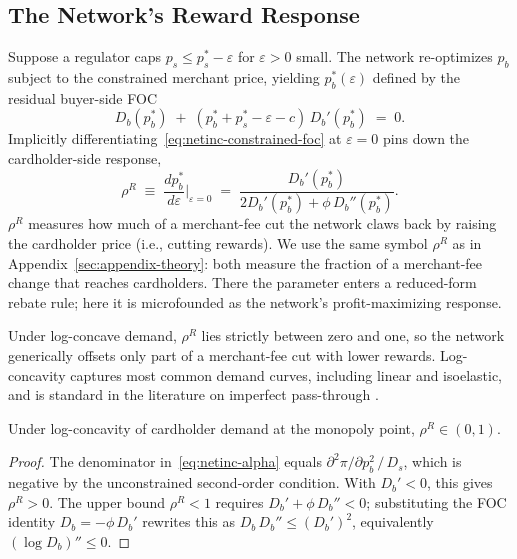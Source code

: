 \documentclass[main.tex]{subfiles}
\begin{document}
\subsection{The Network's Reward Response}\label{subsec:netinc-envelope}

Suppose a regulator caps $p_s\leq p_s^*-\varepsilon$ for $\varepsilon>0$ small.
The network re-optimizes $p_b$ subject to the constrained merchant price, yielding $p_b^*(\varepsilon)$ defined by the residual buyer-side FOC
\begin{equation}
D_b(p_b^*)\;+\;(p_b^*+p_s^*-\varepsilon-c)\,D_b'(p_b^*)\;=\;0.
\label{eq:netinc-constrained-foc}
\end{equation}
Implicitly differentiating~\eqref{eq:netinc-constrained-foc} at $\varepsilon=0$ pins down the cardholder-side response,
\begin{equation}
\rho^R\;\equiv\;\frac{dp_b^*}{d\varepsilon}\bigg|_{\varepsilon=0}\;=\;\frac{D_b'(p_b^*)}{2D_b'(p_b^*)+\phi\,D_b''(p_b^*)}.
\label{eq:netinc-alpha}
\end{equation}
$\rho^R$ measures how much of a merchant-fee cut the network claws back by raising the cardholder price (i.e., cutting rewards).
We use the same symbol $\rho^R$ as in Appendix~\ref{sec:appendix-theory}: both measure the fraction of a merchant-fee change that reaches cardholders.
There the parameter enters a reduced-form rebate rule; here it is microfounded as the network's profit-maximizing response.

Under log-concave demand, $\rho^R$ lies strictly between zero and one, so the network generically offsets only part of a merchant-fee cut with lower rewards.
Log-concavity captures most common demand curves, including linear and isoelastic, and is standard in the literature on imperfect pass-through \citep{Weyl.Fabinger2013}.

\begin{lemma}\label{lem:alpha-range}
Under log-concavity of cardholder demand at the monopoly point, $\rho^R\in(0,1)$.
\end{lemma}

\begin{proof}
The denominator in~\eqref{eq:netinc-alpha} equals $\partial^2\pi/\partial p_b^2\,/\,D_s$, which is negative by the unconstrained second-order condition. With $D_b'<0$, this gives $\rho^R>0$. The upper bound $\rho^R<1$ requires $D_b'+\phi\,D_b''<0$; substituting the FOC identity $D_b=-\phi\,D_b'$ rewrites this as $D_b\,D_b''\leq(D_b')^2$, equivalently $(\log D_b)''\leq 0$.
\end{proof}
\end{document}
